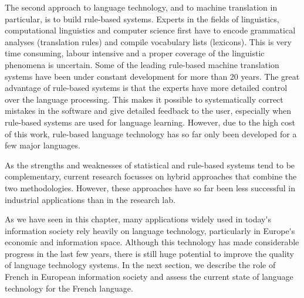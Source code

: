 \documentclass[]{../metanetpaper}
\begin{document}
\begin{multicols}{2}
The second approach to language technology, and to machine translation in particular, is to build rule-based systems. Experts in the fields of linguistics, computational linguistics and computer science first have to encode grammatical analyses (translation rules) and compile vocabulary lists (lexicons). This is very time consuming, labour intensive and a proper coverage of the linguistic phenomena is uncertain. Some of the leading rule-based machine translation systems have been under constant development for more than 20 years. The great advantage of rule-based systems is that the experts have more detailed control over the language processing. This makes it possible to systematically correct mistakes in the software and give detailed feedback to the user, especially when rule-based systems are used for language learning. However, due to the high cost of this work, rule-based language technology has so far only been developed for a few major languages. 


As the strengths and weaknesses of statistical and rule-based systems tend to be complementary, current research focusses on hybrid approaches that combine the two methodologies. However, these approaches have so far been less successful in industrial applications than in the research lab. 

As we have seen in this chapter, many applications widely used in
today{\mbox '}s information society rely heavily on language technology,
particularly in Europe{\mbox '}s economic and information space. Although this
technology has made considerable progress in the last few years, there
is still huge potential to improve the quality of language technology
systems. In the next section, we describe the role of French in
European information society and assess the current state of language
technology for the French language.
\end{multicols}

\clearpage

\end{document}
